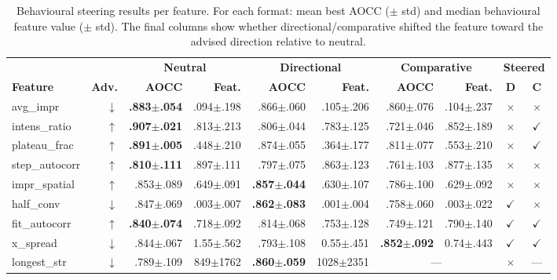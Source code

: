 \begin{table}[p]
\centering
\caption{Behavioural steering results per feature. For each format: mean best AOCC ($\pm$ std) and median behavioural feature value ($\pm$ std). The final columns show whether directional/comparative shifted the feature toward the advised direction relative to neutral.}
\label{tab:steering-detail}
\footnotesize
\setlength{\tabcolsep}{3.5pt}
\begin{tabular}{@{}lr|rr|rr|rr|cc@{}}
\toprule
& & \multicolumn{2}{c|}{\textbf{Neutral}} & \multicolumn{2}{c|}{\textbf{Directional}} & \multicolumn{2}{c|}{\textbf{Comparative}} & \multicolumn{2}{c}{\textbf{Steered}} \\
\textbf{Feature} & \textbf{Adv.} & \textbf{AOCC} & \textbf{Feat.} & \textbf{AOCC} & \textbf{Feat.} & \textbf{AOCC} & \textbf{Feat.} & \textbf{D} & \textbf{C} \\
\midrule
avg\_impr      & $\downarrow$ & \textbf{.883$\pm$.054} & .094$\pm$.198 & .866$\pm$.060 & .105$\pm$.206 & .860$\pm$.076 & .104$\pm$.237 & $\times$ & $\times$ \\
intens\_ratio  & $\uparrow$   & \textbf{.907$\pm$.021} & .813$\pm$.213 & .806$\pm$.044 & .783$\pm$.125 & .721$\pm$.046 & .852$\pm$.189 & $\times$ & $\checkmark$ \\
plateau\_frac  & $\uparrow$   & \textbf{.891$\pm$.005} & .448$\pm$.210 & .874$\pm$.055 & .364$\pm$.177 & .811$\pm$.077 & .553$\pm$.210 & $\times$ & $\checkmark$ \\
step\_autocorr & $\uparrow$   & \textbf{.810$\pm$.111} & .897$\pm$.111 & .797$\pm$.075 & .863$\pm$.123 & .761$\pm$.103 & .877$\pm$.135 & $\times$ & $\times$ \\
impr\_spatial  & $\uparrow$   & .853$\pm$.089 & .649$\pm$.091 & \textbf{.857$\pm$.044} & .630$\pm$.107 & .786$\pm$.100 & .629$\pm$.092 & $\times$ & $\times$ \\
half\_conv     & $\downarrow$ & .847$\pm$.069 & .003$\pm$.007 & \textbf{.862$\pm$.083} & .001$\pm$.004 & .758$\pm$.060 & .003$\pm$.022 & $\checkmark$ & $\times$ \\
fit\_autocorr  & $\uparrow$   & \textbf{.840$\pm$.074} & .718$\pm$.092 & .814$\pm$.068 & .753$\pm$.128 & .749$\pm$.121 & .790$\pm$.140 & $\checkmark$ & $\checkmark$ \\
x\_spread      & $\downarrow$ & .844$\pm$.067 & 1.55$\pm$.562 & .793$\pm$.108 & 0.55$\pm$.451 & \textbf{.852$\pm$.092} & 0.74$\pm$.443 & $\checkmark$ & $\checkmark$ \\
longest\_str   & $\downarrow$ & .789$\pm$.109 & 849$\pm$1762  & \textbf{.860$\pm$.059} & 1028$\pm$2351 & \multicolumn{2}{c|}{---} & $\times$ & --- \\

\end{tabular}
\end{table}
